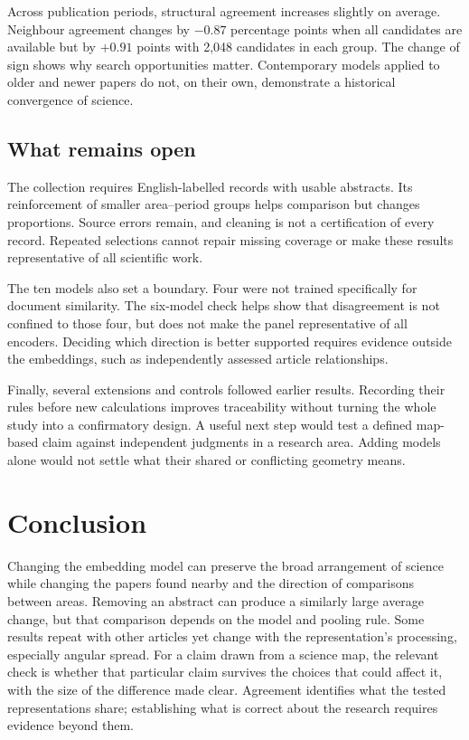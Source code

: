 \documentclass[12pt]{article}
\begin{document}
Across publication periods, structural agreement increases slightly on average. Neighbour agreement changes by $-0.87$ percentage points when all candidates are available but by $+0.91$ points with 2,048 candidates in each group. The change of sign shows why search opportunities matter. Contemporary models applied to older and newer papers do not, on their own, demonstrate a historical convergence of science.

\subsection{What remains open}
The collection requires English-labelled records with usable abstracts. Its reinforcement of smaller area--period groups helps comparison but changes proportions. Source errors remain, and cleaning is not a certification of every record. Repeated selections cannot repair missing coverage or make these results representative of all scientific work.

The ten models also set a boundary. Four were not trained specifically for document similarity. The six-model check helps show that disagreement is not confined to those four, but does not make the panel representative of all encoders. Deciding which direction is better supported requires evidence outside the embeddings, such as independently assessed article relationships.

Finally, several extensions and controls followed earlier results. Recording their rules before new calculations improves traceability without turning the whole study into a confirmatory design. A useful next step would test a defined map-based claim against independent judgments in a research area. Adding models alone would not settle what their shared or conflicting geometry means.

\section{Conclusion}
Changing the embedding model can preserve the broad arrangement of science while changing the papers found nearby and the direction of comparisons between areas. Removing an abstract can produce a similarly large average change, but that comparison depends on the model and pooling rule. Some results repeat with other articles yet change with the representation's processing, especially angular spread. For a claim drawn from a science map, the relevant check is whether that particular claim survives the choices that could affect it, with the size of the difference made clear. Agreement identifies what the tested representations share; establishing what is correct about the research requires evidence beyond them.
\end{document}
